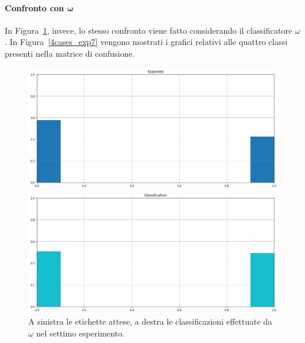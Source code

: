 \documentclass[12pt]{report}
\theoremstyle{definition}
\begin{document}
\paragraph{Confronto con $\bm{\omega}$}
In Figura~\ref{classification_exp7}, invece, lo stesso confronto viene fatto considerando il classificatore $\omega$. 
In Figura~\ref{4cases_exp7} vengono mostrati i grafici relativi alle quattro classi presenti nella matrice di confusione.
\begin{figure}
\centering
    \begin{minipage}{0.48\textwidth}
        \includegraphics[width=\linewidth]{images/experiment_kaggle/expected_classification.png}
    \end{minipage}
    \begin{minipage}{0.48\textwidth}
        \includegraphics[width=\linewidth]{images/experiment_kaggle/prediction_classification.png}
    \end{minipage}
    \caption{A sinistra le etichette attese, a destra le classificazioni effettuate da $\omega$ nel settimo esperimento.}
    \label{classification_exp7}
\end{figure}
\end{document}
